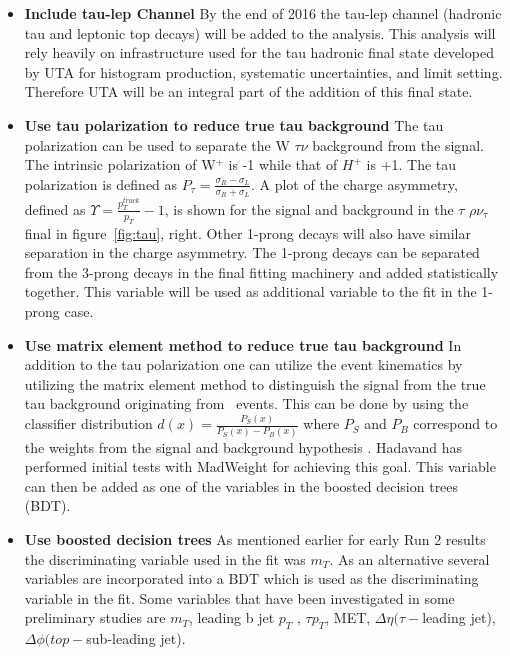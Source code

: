 \begin{itemize}[noitemsep,nolistsep,leftmargin=*]
\item[]{{\bf Include tau-lep Channel}
By the end of 2016 the tau-lep channel (hadronic tau and leptonic top decays) will be added to the analysis.  This analysis will rely heavily on infrastructure used for the  tau hadronic final state developed by UTA 
for histogram production, systematic uncertainties, and limit setting. Therefore UTA will be an integral part of the addition of this final state.}

\item[]{{\bf Use tau polarization to reduce true tau background}
The tau polarization can be used to separate the W \too $\tau \nu$ background from the signal.  The intrinsic polarization of W$^+$ is -1 while that of $H^+$ is +1.  The tau polarization is defined as $P_{\tau}=\frac{\sigma_R - \sigma_L}{\sigma_R + \sigma_L}$.
A plot of the charge asymmetry, defined as $\Upsilon=\frac{p_{T}^{track}}{p_T} - 1$, is shown for the signal and background in the $\tau$ \too $\rho \nu_{\tau}$ final in figure~\ref{fig:tau}, right. Other 1-prong decays will also have similar separation in the charge asymmetry. 
The 1-prong decays can be separated from the 3-prong decays in the final fitting machinery and added statistically together.  This variable will be used as additional variable to the fit in the 1-prong case.}

\item[]{{\bf Use matrix element method to reduce true tau background}
In addition to the tau polarization one can utilize the event kinematics by utilizing the matrix element method to distinguish the signal from the true tau background originating from \ttbar\ events.  
This can be done by using the classifier distribution $d(x)=\frac{P_S(x)}{P_S(x)-P_B(x)}$ where $P_S$ and $P_B$ correspond to the weights from the signal and background 
hypothesis . Hadavand has performed initial tests with MadWeight for achieving this goal. This variable can then be added as one of the variables in the boosted decision trees (BDT). }

\item[]{{\bf Use boosted decision trees}
As mentioned earlier for early Run 2 results the discriminating variable used in the fit was $m_T$. As an alternative several 
variables are incorporated into a BDT which is used as the discriminating variable in the fit.  Some variables that have been investigated in some preliminary studies
are $m_T$, leading b jet $p_T$ , $\tau p_T$, MET, $\Delta \eta(\tau-$leading jet), $\Delta \phi(top-$sub-leading jet).}


\end{itemize}
